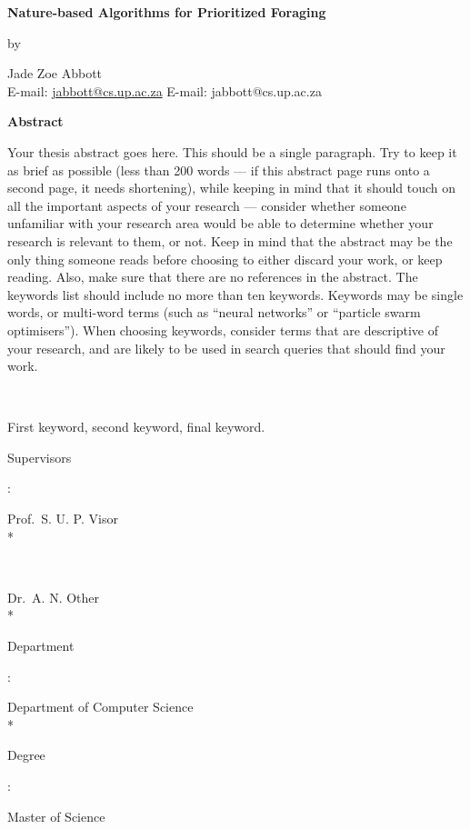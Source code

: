 
\newpage

\begin{center}
	{\large\bf Nature-based Algorithms for Prioritized Foraging}
\end{center}
\begin{center}by\end{center}
\begin{center}
	{Jade Zoe Abbott}\\
	\ifpdf
		E-mail: \href{mailto:jabbott@cs.up.ac.za}{jabbott@cs.up.ac.za}
	\else
		E-mail: jabbott@cs.up.ac.za
	\fi
\end{center}
\vspace{1cm}
\begin{center}{\large\bf Abstract}\end{center}
Your thesis abstract goes here. This should be a single paragraph. Try to keep it as brief as possible (less than 200 words --- if this abstract page runs onto a second page, it needs shortening), while keeping in mind that it should touch on all the important aspects of your research --- consider whether someone unfamiliar with your research area would be able to determine whether your research is relevant to them, or not. Keep in mind that the abstract may be the only thing someone reads before choosing to either discard your work, or keep reading. Also, make sure that there are no references in the abstract. The keywords list should include no more than ten keywords. Keywords may be single words, or multi-word terms (such as ``neural networks'' or ``particle swarm optimisers''). When choosing keywords, consider terms that are descriptive of your research, and are likely to be used in search queries that should find your work.

\noindent\

 First keyword, second keyword, final keyword.

\vfill
\noindent
{\bf\parbox{26.8mm}{Supervisors}:} Prof.~S. U. P. Visor \\* %
{\bf\parbox{28.55mm}{~}} Dr.~A. N. Other \\*
{\bf\parbox{26.8mm}{Department}:} Department of Computer Science \\*
{\bf\parbox{26.8mm}{Degree}:} Master of Science

